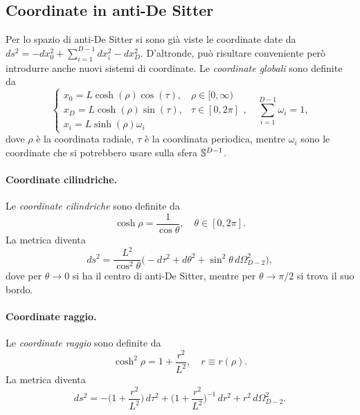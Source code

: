 \subsection{Coordinate in anti-De Sitter}
Per lo spazio di anti-De Sitter si sono già viste le coordinate date da $ds^2 = -dx_0^2 + \sum_{i=1}^{D - 1}dx_i^2 - dx_D^2$. D'altronde, può risultare conveniente però introdurre anche nuovi sistemi di coordinate. Le \emph{coordinate globali} sono definite da 
\begin{equation}
    \begin{cases}
        x_0 = L\cosh{(\rho)}\cos{(\tau)}, &\rho \in [0,\infty) \\
        x_D = L\cosh{(\rho)}\sin{(\tau)}, &\tau \in [0,2\pi] \\
        x_i = L\sinh{(\rho)}\omega_i
    \end{cases},\quad \sum_{i=1}^{D - 1}\omega_i = 1,
\end{equation}
dove $\rho$ è la coordinata radiale, $\tau$ è la coordinata periodica, mentre $\omega_i$ sono le coordinate che si potrebbero usare sulla sfera $\mathbb{S}^{D - 1}$. 

\paragraph{Coordinate cilindriche.} Le \emph{coordinate cilindriche} sono definite da 
\begin{equation}
    \cosh{\rho} = \frac{1}{\cos{\theta}},\quad \theta \in [0,2\pi].
\end{equation}
La metrica diventa
\begin{equation}
    ds^2 = \frac{L^2}{\cos^2{\theta}}\bigg(-d\tau^2 + d\theta^2 + \sin^2{\theta}\,d\Omega^2_{D - 2}),
\end{equation}
dove per $\theta \to 0$ si ha il centro di anti-De Sitter, mentre per $\theta \to \pi/2$ si trova il suo bordo.

\paragraph{Coordinate raggio.} Le \emph{coordinate raggio} sono definite da 
\begin{equation}
    \cosh^2{\rho} = 1 + \frac{r^2}{L^2},\quad r \equiv r(\rho).
\end{equation}
La metrica diventa 
\begin{equation}
    ds^2 = -\bigg(1 + \frac{r^2}{L^2}\bigg)\,d\tau^2 + \bigg(1 + \frac{r^2}{L^2}\bigg)^{-1}\,dr^2 + r^2\,d\Omega_{D - 2}^2.
\end{equation}

